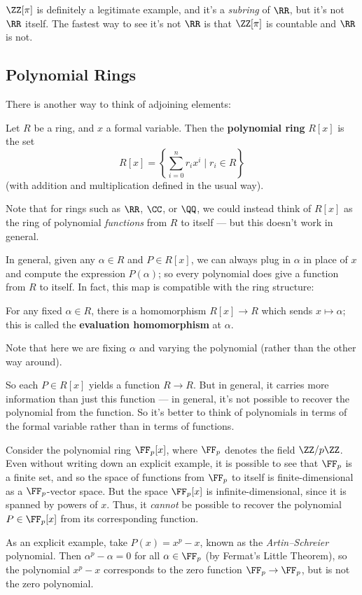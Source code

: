 \begin{ans}
$\ZZ[\pi]$ is definitely a legitimate example, and it's a \emph{subring} of $\RR$, but it's not $\RR$ itself. The fastest way to see it's not $\RR$ is that $\ZZ[\pi]$ is countable and $\RR$ is not. 
\end{ans}

\subsection{Polynomial Rings}

There is another way to think of adjoining elements:

\begin{definition}
    Let $R$ be a ring, and $x$ a formal variable. Then the \textbf{polynomial ring} $R[x]$ is the set \[R[x] = \left\{\sum_{i = 0}^n r_ix^i \mid r_i \in R\right\}\] (with addition and multiplication defined in the usual way).  
\end{definition}

Note that for rings such as $\RR$, $\CC$, or $\QQ$, we could instead think of $R[x]$ as the ring of polynomial \emph{functions} from $R$ to itself --- but this doesn't work in general. 

In general, given any $\alpha \in R$ and $P \in R[x]$, we can always plug in $\alpha$ in place of $x$ and compute the expression $P(\alpha)$; so every polynomial does give a function from $R$ to itself. In fact, this map is compatible with the ring structure:

\begin{definition}
For any fixed $\alpha \in R$, there is a homomorphism $R[x] \to R$ which sends $x \mapsto \alpha$; this is called the \textbf{evaluation homomorphism} at $\alpha$. 
\end{definition}

Note that here we are fixing $\alpha$ and varying the polynomial (rather than the other way around). 

So each $P \in R[x]$ yields a function $R \to R$. But in general, it carries more information than just this function --- in general, it's not possible to recover the polynomial from the function. So it's better to think of polynomials in terms of the formal variable rather than in terms of functions.  

\begin{example}
Consider the polynomial ring $\FF_p[x]$, where $\FF_p$ denotes the field $\ZZ/p\ZZ$. Even without writing down an explicit example, it is possible to see that $\FF_p$ is a finite set, and so the space of functions from $\FF_p$ to itself is finite-dimensional as a $\FF_p$-vector space. But the space $\FF_p[x]$ is infinite-dimensional, since it is spanned by powers of $x$. Thus, it \emph{cannot} be possible to recover the polynomial $P \in \FF_p[x]$ from its corresponding function.

As an explicit example, take $P(x) = x^p - x$, known as the \emph{Artin--Schreier} polynomial. Then $\alpha^p - \alpha = 0$ for all $\alpha \in \FF_p$ (by Fermat's Little Theorem), so the polynomial $x^p - x$ corresponds to the zero function $\FF_p \to \FF_p$, but is not the zero polynomial.
\end{example}

